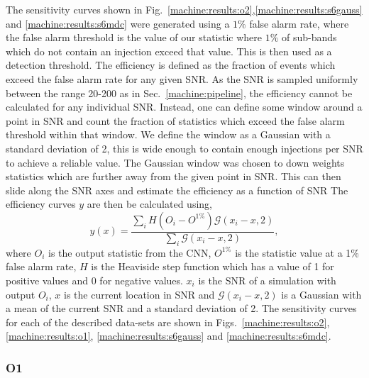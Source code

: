 %
The sensitivity curves shown in Fig.~\ref{machine:results:o2},\ref{machine:results:s6gauss} and
\ref{machine:results:s6mdc} were generated using a $1\%$ false alarm rate, where the
false alarm threshold is the value of our statistic where $1\%$ of sub-bands which
do not contain an injection exceed that value. This is then used as a detection
threshold.
The efficiency is defined as the fraction of events which exceed the false alarm rate for any given \gls{SNR}.
As the \gls{SNR} is sampled uniformly between the range 20-200 as in Sec.~\ref{machine:pipeline}, the efficiency cannot be calculated for any individual \gls{SNR}.
Instead, one can define some window around a point in \gls{SNR} and count the fraction of statistics which exceed the false alarm threshold within that window.
We define the window as a Gaussian with a standard deviation of 2, this is wide enough to contain enough injections per \gls{SNR} to achieve a reliable value. The Gaussian window was chosen to down weights statistics which are further away from the given point in \gls{SNR}.
This can then slide along the \gls{SNR} axes and estimate the efficiency as a function of \gls{SNR}
The efficiency curves $y$ are then be calculated using,
%
\begin{equation}
y(x) = \frac{\sum_i H(O_i - O^{1\%}) \mathcal{G}(x_i - x,2)}{\sum_i \mathcal{G}(x_i - x,2)},
\end{equation}
%
where $O_i$ is the output statistic from the \gls{CNN}, $O^{1\%}$ is the statistic value at a 1\% false alarm rate, $H$ is the Heaviside step function which has a value of 1 for positive values and 0 for negative values. $x_i$ is the \gls{SNR} of a simulation with output $O_i$, $x$ is the current location in \gls{SNR} and $\mathcal{G}(x_i - x,2)$ is a Gaussian with a
mean of the current \gls{SNR} and a standard deviation of 2.  
The sensitivity curves for each of the described data-sets are shown in
Figs.~\ref{machine:results:o2}, \ref{machine:results:o1}, \ref{machine:results:s6gauss} and
\ref{machine:results:s6mdc}.


\subsubsection{O1}


